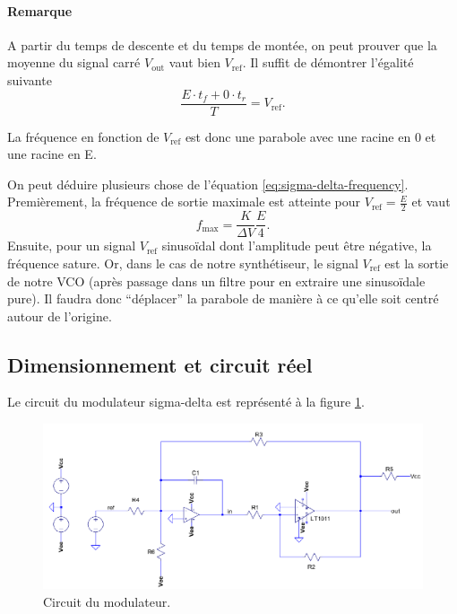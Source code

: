 \paragraph{Remarque}
A partir du temps de descente et du temps de montée, on
peut prouver que la moyenne du signal carré $V_{\text{out}}$
vaut bien $V_{\text{ref}}$. Il suffit de démontrer l'égalité
suivante
\[ \frac{E \cdot t_f + 0 \cdot t_r}{T} = V_{\text{ref}}.\]

La fréquence en fonction de $V_{\text{ref}}$ est donc
une parabole avec une racine en \unit{0}{\volt} et une
racine en \unit{E}{\volt}.

On peut déduire plusieurs chose de l'équation \ref{eq:sigma-delta-frequency}. 
Premièrement, la fréquence de sortie maximale est atteinte pour 
$V_{\text{ref}} = \frac{E}{2}$ et vaut
\[ f_{\text{max}} = \frac{K}{\Delta V}\frac{E}{4}. \]
Ensuite, pour un signal $V_{\text{ref}}$ sinusoïdal dont
l'amplitude peut être négative, la fréquence sature.
Or, dans le cas de notre synthétiseur, le signal $V_{\text{ref}}$
est la sortie de notre VCO (après passage dans un filtre pour
en extraire une sinusoïdale pure).
Il faudra donc ``déplacer'' la parabole de manière à ce qu'elle soit
centré autour de l'origine.

\subsection{Dimensionnement et circuit réel}
Le circuit du modulateur sigma-delta est représenté
à la figure \ref{fig:sigma-delta-circuit}.

\begin{figure}[ht]
	\centering
	\includegraphics[scale=0.7]{img/sigma-delta-circuit.png}
	\caption{Circuit du modulateur.}
	\label{fig:sigma-delta-circuit}
\end{figure}

